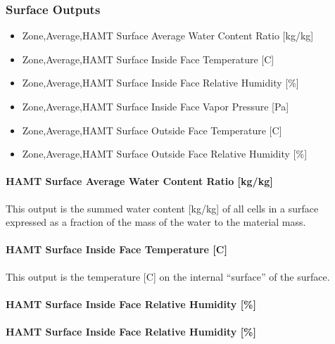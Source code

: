 \subsubsection{Surface Outputs}\label{surface-outputs}

\begin{itemize}
\item
  Zone,Average,HAMT Surface Average Water Content Ratio {[}kg/kg{]}
\item
  Zone,Average,HAMT Surface Inside Face Temperature {[}C{]}
\item
  Zone,Average,HAMT Surface Inside Face Relative Humidity {[}\%{]}
\item
  Zone,Average,HAMT Surface Inside Face Vapor Pressure {[}Pa{]}
\item
  Zone,Average,HAMT Surface Outside Face Temperature {[}C{]}
\item
  Zone,Average,HAMT Surface Outside Face Relative Humidity {[}\%{]}
\end{itemize}

\paragraph{HAMT Surface Average Water Content Ratio {[}kg/kg{]}}\label{hamt-surface-average-water-content-ratio-kgkg}

This output is the summed water content {[}kg/kg{]} of all cells in a surface expressed as a fraction of the mass of the water to the material mass.

\paragraph{HAMT Surface Inside Face Temperature {[}C{]}}\label{hamt-surface-inside-face-temperature-c}

This output is the temperature {[}C{]} on the internal ``surface'' of the surface.

\paragraph{HAMT Surface Inside Face Relative Humidity {[}\%{]}}\label{hamt-surface-inside-face-relative-humidity}

\paragraph{HAMT Surface Inside Face Relative Humidity {[}\%{]}}\label{hamt-surface-inside-face-relative-humidity-1}

